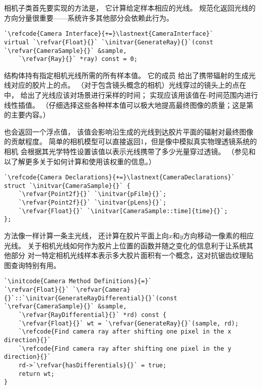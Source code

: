 相机子类首先要实现的方法是，
它计算给定样本相应的光线。
规范化返回光线的方向分量很重要——系统许多其他部分会依赖此行为。

\begin{lstlisting}
`\refcode{Camera Interface}{+=}\lastnext{CameraInterface}`
virtual `\refvar{Float}{}` `\initvar{GenerateRay}{}`(const `\refvar{CameraSample}{}` &sample,
    `\refvar{Ray}{}` *ray) const = 0;
\end{lstlisting}

结构体持有指定相机光线所需的所有样本值。
它的成员
给出了携带辐射的生成光线对应的胶片上的点。
（对于包含镜头概念的相机）光线穿过的镜头上的点在中，
给出了光线应该对场景进行采样的时间；
实现应该用该值在-时间范围内进行线性插值。
（仔细选择这些各种样本值可以极大地提高最终图像的质量；这是第的主要内容。）

也会返回一个浮点值，
该值会影响沿生成的光线到达胶片平面的辐射对最终图像的贡献程度。
简单的相机模型可以直接返回1，但是像中模拟真实物理透镜系统的相机
会根据其光学特性设置该值以表示光线携带了多少光量穿过透镜。
（参见和以了解更多关于如何计算和使用该权重的信息。）
\begin{lstlisting}
`\refcode{Camera Declarations}{+=}\lastnext{CameraDeclarations}`
struct `\initvar{CameraSample}{}` {
    `\refvar{Point2f}{}` `\initvar{pFilm}{}`;
    `\refvar{Point2f}{}` `\initvar{pLens}{}`;
    `\refvar{Float}{}` `\initvar[CameraSample::time]{time}{}`;
};
\end{lstlisting}

方法像一样计算一条主光线，
还计算在胶片平面上向$x$和$y$方向移动一像素的相应光线。
关于相机光线如何作为胶片上位置的函数并随之变化的信息利于让系统其他部分
对一特定相机光线样本表示多大胶片面积有一个概念，这对抗锯齿纹理贴图查询特别有用。
\begin{lstlisting}
`\initcode{Camera Method Definitions}{=}`
`\refvar{Float}{}` `\refvar{Camera}{}`::`\initvar{GenerateRayDifferential}{}`(const `\refvar{CameraSample}{}` &sample,
    `\refvar{RayDifferential}{}` *rd) const {
    `\refvar{Float}{}` wt = `\refvar{GenerateRay}{}`(sample, rd);
    `\refcode{Find camera ray after shifting one pixel in the x direction}{}`
    `\refcode{Find camera ray after shifting one pixel in the y direction}{}`
    rd->`\refvar{hasDifferentials}{}` = true;
    return wt;
}
\end{lstlisting}

